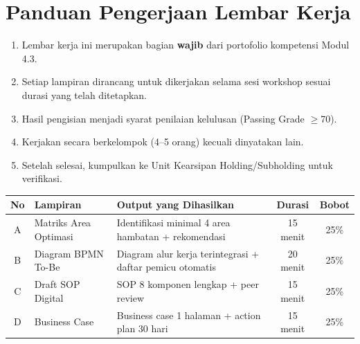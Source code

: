 \documentclass[12pt,a4paper]{report}
\begin{document}
\newpage
\thispagestyle{fancy}

\section*{\color{plnblue}Panduan Pengerjaan Lembar Kerja}

\begin{infobox}
\begin{enumerate}
    \item Lembar kerja ini merupakan bagian \textbf{wajib} dari portofolio kompetensi Modul 4.3.
    \item Setiap lampiran dirancang untuk dikerjakan selama sesi workshop sesuai durasi yang telah ditetapkan.
    \item Hasil pengisian menjadi syarat penilaian kelulusan (Passing Grade $\geq$70).
    \item Kerjakan secara berkelompok (4--5 orang) kecuali dinyatakan lain.
    \item Setelah selesai, kumpulkan ke Unit Kearsipan Holding/Subholding untuk verifikasi.
\end{enumerate}
\end{infobox}

\vspace{0.4cm}


\vspace{0.2cm}

{\small
\renewcommand{\arraystretch}{1.6}
\begin{tabularx}{\textwidth}{@{} c p{4.2cm} X c c @{}}
\toprule
\textbf{No} & \textbf{Lampiran} & \textbf{Output yang Dihasilkan} & \textbf{Durasi} & \textbf{Bobot} \\
\midrule
A & Matriks Area Optimasi & Identifikasi minimal 4 area hambatan + rekomendasi & 15 menit & 25\% \\
B & Diagram BPMN To-Be & Diagram alur kerja terintegrasi + daftar pemicu otomatis & 20 menit & 25\% \\
C & Draft SOP Digital & SOP 8 komponen lengkap + peer review & 15 menit & 25\% \\
D & Business Case & Business case 1 halaman + action plan 30 hari & 15 menit & 25\% \\
\bottomrule
\end{tabularx}
\renewcommand{\arraystretch}{1.0}
}
\end{document}

